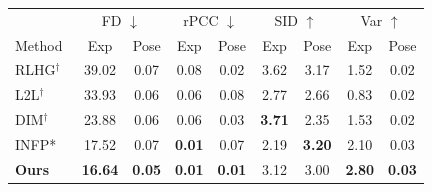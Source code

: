 \begin{figure}[t]
\begin{minipage}[t]{0.49\linewidth}
{    \begin{tabular}{l cc cc cc cc}
    \toprule
     & \multicolumn{2}{c}{FD $\downarrow$}  & \multicolumn{2}{c}{rPCC $\downarrow$}  & \multicolumn{2}{c}{SID $\uparrow$} & \multicolumn{2}{c}{Var $\uparrow$} \\
    \cmidrule(l{2pt}r{2pt}){2-3}
    \cmidrule(l{2pt}r{2pt}){4-5}
    \cmidrule(l{2pt}r{2pt}){6-7}
    \cmidrule(l{2pt}r{2pt}){8-9}
            Method  & Exp  & Pose  & Exp  & Pose  &  Exp  &  Pose  &  Exp  &  Pose       \\
            \midrule
    RLHG$^\dagger$~\citep{rlhg}   &   39.02          &  0.07            &  0.08         &  0.02           & 3.62    &   3.17     &  1.52   &  0.02           \\
    L2L$^\dagger$~\citep{l2l}     &   33.93          &  0.06            &  0.06         &  0.08           & 2.77    &   2.66     &  0.83   &  0.02           \\
    DIM$^\dagger$~\citep{dim}     &   23.88          &  0.06            &  0.06         &  0.03           & \textbf{3.71}    &   2.35     &  1.53   &  0.02           \\
    INFP*~\citep{infp}  &   17.52              &  0.07               &  \textbf{0.01}            &  0.07             & 2.19 & \textbf{3.20}      &  2.10 &  0.03           \\
    \midrule
    \textbf{Ours}      &   \textbf{16.64}              &  \textbf{0.05}               &  \textbf{0.01}            &  \textbf{0.01}             & 3.12      &   3.00   &  \textbf{2.80} &  \textbf{0.03}           \\
    \bottomrule
    \end{tabular}
}
\vspace{-0.2in}
\end{minipage}
\vspace{-0.1in}
\end{figure}
